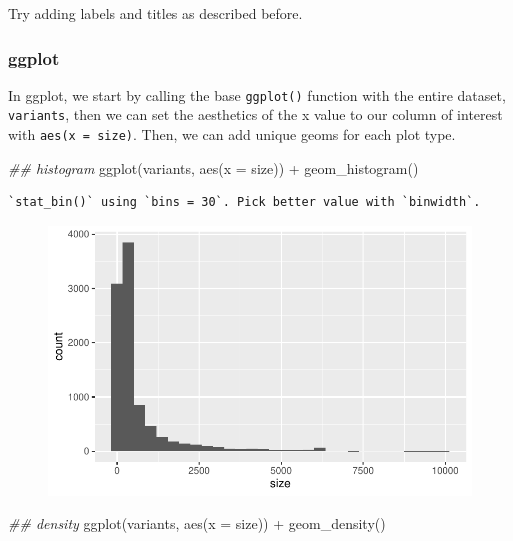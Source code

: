 \documentclass[
  letterpaper,
  DIV=11,
  numbers=noendperiod]{scrreprt}
\newenvironment{Shaded}{\begin{snugshade}}{\end{snugshade}}
\newcommand{\AttributeTok}[1]{\textcolor[rgb]{0.40,0.45,0.13}{#1}}
\newcommand{\DocumentationTok}[1]{\textcolor[rgb]{0.37,0.37,0.37}{\textit{#1}}}
\newcommand{\FunctionTok}[1]{\textcolor[rgb]{0.28,0.35,0.67}{#1}}
\newcommand{\NormalTok}[1]{\textcolor[rgb]{0.00,0.23,0.31}{#1}}
\newcommand{\SpecialCharTok}[1]{\textcolor[rgb]{0.37,0.37,0.37}{#1}}
\begin{document}
Try adding labels and titles as described before.

\hypertarget{ggplot-1}{%
\subsubsection{ggplot}\label{ggplot-1}}

In ggplot, we start by calling the base \texttt{ggplot()} function with
the entire dataset, \texttt{variants}, then we can set the aesthetics of
the x value to our column of interest with \texttt{aes(x\ =\ size)}.
Then, we can add unique geoms for each plot type.

\begin{Shaded}
\begin{Highlighting}[]
\DocumentationTok{\#\# histogram}
\FunctionTok{ggplot}\NormalTok{(variants, }\FunctionTok{aes}\NormalTok{(}\AttributeTok{x =}\NormalTok{ size)) }\SpecialCharTok{+}
  \FunctionTok{geom\_histogram}\NormalTok{()}
\end{Highlighting}
\end{Shaded}

\begin{verbatim}
`stat_bin()` using `bins = 30`. Pick better value with `binwidth`.
\end{verbatim}

\begin{figure}[H]

{\centering \includegraphics{scripts/02_dataViz/class3_files/figure-pdf/unnamed-chunk-14-1.pdf}

}

\end{figure}

\begin{Shaded}
\begin{Highlighting}[]
\DocumentationTok{\#\# density}
\FunctionTok{ggplot}\NormalTok{(variants, }\FunctionTok{aes}\NormalTok{(}\AttributeTok{x =}\NormalTok{ size)) }\SpecialCharTok{+}
  \FunctionTok{geom\_density}\NormalTok{()}
\end{Highlighting}
\end{Shaded}
\end{document}
